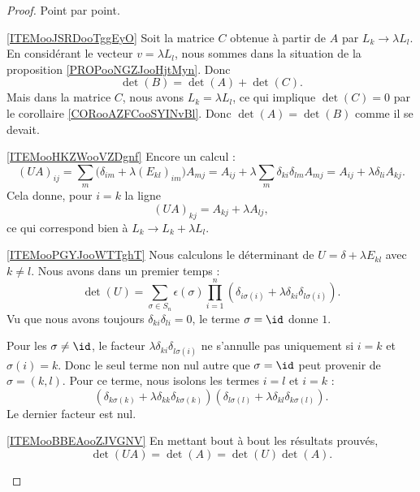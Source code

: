 \begin{proof}
    Point par point.
    \begin{subproof}
    \item[\ref{ITEMooJSRDooTggEyO}]
        Soit la matrice \( C\) obtenue à partir de \( A\) par \( L_k\to \lambda L_l\). En considérant le vecteur \( v=\lambda L_l\), nous sommes dans la situation de la proposition \ref{PROPooNGZJooHjtMyn}. Donc
        \begin{equation}
            \det(B)=\det(A)+\det(C).
        \end{equation}
        Mais dans la matrice \( C\), nous avons \( L_k=\lambda L_l\), ce qui implique \( \det(C)=0\) par le corollaire \ref{CORooAZFCooSYINvBl}. Donc \( \det(A)=\det(B)\) comme il se devait.
    \item[\ref{ITEMooHKZWooVZDgnf}]
        Encore un calcul :
        \begin{equation}
            (UA)_{ij}=\sum_m\big( \delta_{im}+\lambda(E_{kl})_{im} \big)A_{mj}=A_{ij}+\lambda\sum_m\delta_{ki}\delta_{lm}A_{mj}=A_{ij}+\lambda \delta_{li}A_{kj}.
        \end{equation}
        Cela donne, pour \( i=k\) la ligne
        \begin{equation}
            (UA)_{kj}=A_{kj}+\lambda A_{lj},
        \end{equation}
        ce qui correspond bien à \( L_k\to L_k+\lambda L_l\).

    \item[\ref{ITEMooPGYJooWTTghT}]
            Nous calculons le déterminant de \( U=\delta+\lambda E_{kl}\) avec \( k\neq l\). Nous avons dans un premier temps :
            \begin{equation}
                \det(U)=\sum_{\sigma\in S_n}\epsilon(\sigma)\prod_{i=1}^n(\delta_{i\sigma(i)}+\lambda \delta_{ki}\delta_{l\sigma(i)}).
            \end{equation}
            Vu que nous avons toujours \( \delta_{ki}\delta_{li}=0\), le terme \( \sigma=\id\) donne \( 1\).

            Pour les \( \sigma\neq \id\), le facteur \( \lambda\delta_{ki}\delta_{l\sigma(i)}\) ne s'annulle pas uniquement si \( i=k\) et \( \sigma(i)=k\). Donc le seul terme non nul autre que \( \sigma=\id\) peut provenir de \( \sigma=(k,l)\). Pour ce terme, nous isolons les termes \( i=l\) et \( i=k\) :
            \begin{equation}
                (\delta_{k\sigma(k)}+\lambda\delta_{kk}\delta_{k\sigma(k)})(\delta_{l\sigma(l)}+\lambda\delta_{kl}\delta_{k\sigma(l)}).
            \end{equation}
            Le dernier facteur est nul.
        \item[\ref{ITEMooBBEAooZJVGNV}]
            En mettant bout à bout les résultats prouvés,
            \begin{equation}
                \det(UA)=\det(A)=\det(U)\det(A).
            \end{equation}
    \end{subproof}
\end{proof}

